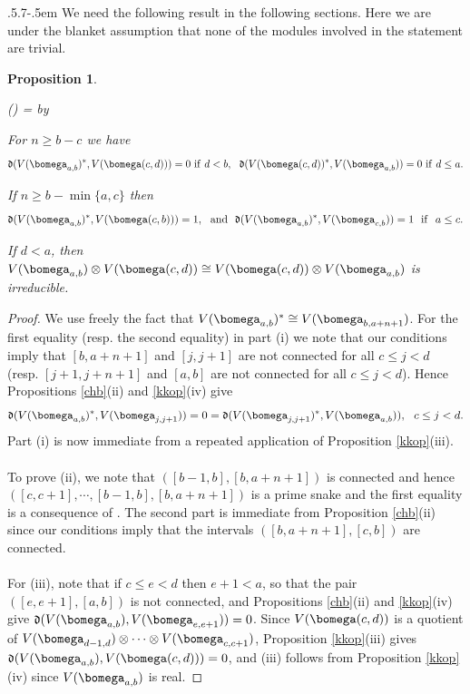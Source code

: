 \documentclass[11pt,reqno]{amsart}
\makeatletter
\newtheorem*{prop}{Proposition}
\theoremstyle{definition} \newtheorem*{defn}{Definition}
\theoremstyle{definition}
\newcounter{cnt}
\newenvironment{enumerit}{\begin{list}{{\hfill\rm(\roman{cnt})\hfill}}{%
\settowidth{\labelwidth}{{\rm(iv)}}\leftmargin=\labelwidth%
\advance\leftmargin by \labelsep\rightmargin=0pt\usecounter{cnt}}}{\end{list}} \makeatletter
\numberwithin{equation}{section}
\newcommand{\lie}[1]{\mathfrak{#1}}
\def\subsection{\def\@secnumfont{\bfseries}\@startsection{subsection}{2}%
  {\parindent}{.5\linespacing\@plus.7\linespacing}{-.5em}%
  {\normalfont\bfseries}}
\makeatother
\begin{document}
\subsection{} We need the following result in the following sections. Here we are under the blanket assumption that none of the modules involved in the statement are trivial. \begin{prop}\label{unmixedpair} \begin{enumerit}
    \item[(i)] For $n\ge b-c$  we have $$\lie d(V(\bomega_{a,b})^*, V(\bomega(c,d)))=0\ {\rm if}\  d<b,\ \  \lie d( V(\bomega(c,d))^*, V(\bomega_{a,b}))=0 \ {\rm if}\  d\le a.$$
    \item[(ii)] If  $n\geq b-\min\{a,c\}$ then
    $$\lie d (V(\bomega_{a,b})^*,V(\bomega(c,b)))=1,\ \ {\rm and}\ \ \lie d (V(\bomega_{a,b})^*,V(\bomega_{c,b}))=1\ \ {\rm if}\ \ a\le c.$$
    \item[(iii)] If $d<a$, then $V(\bomega_{a,b})\otimes V(\bomega(c,d))\cong V(\bomega(c,d))\otimes V(\bomega_{a,b})$
    is irreducible.
\end{enumerit}
\end{prop}
    \begin{proof}  We use freely the fact that $V(\bomega_{a,b})^* \cong V(\bomega_{b,a+n+1})$. For the first equality (resp. the second equality) in part (i)
 we note that our conditions imply that $[b,a+n+1]$ and $[j,j+1]$ are not connected for all $c\le j<d$ (resp. $[j+1,j+n+1]$ and $[a,b]$  are not connected for all $c\le j<d$). Hence Propositions \ref{chb}(ii) and \ref{kkop}(iv) give $$\lie d(V(\bomega_{a,b})^*, V(\bomega_{j,j+1}))=0=\lie d(V(\bomega_{j,j+1})^*, V(\bomega_{a,b})),\ \ c\le j<d.$$
Part (i)  is now  immediate from a repeated application of  Proposition \ref{kkop}(iii).\\\\
To prove (ii), we note that $([b-1,b],[b,a+n+1])$  is connected and hence $([c,c+1],\cdots, [b-1,b],[b,a+n+1])$ is a prime snake and the first equality is a consequence of  \cite[Lemma 6.2.1]{Naoi24}.
The second part is immediate from Proposition \ref{chb}(ii) since our conditions imply that
the intervals $([b,a+n+1],[c,b])$ are connected.\\\\
For (iii), note that if $c\le e<d$ then $e+1<a$, so that the pair $([e,e+1],[a,b])$ is not connected,
and Propositions \ref{chb}(ii) and \ref{kkop}(iv) give $\lie d(V(\bomega_{a,b}),V(\bomega_{e,e+1}))=0$.
Since $V(\bomega(c,d))$ is a quotient of $V(\bomega_{d-1,d})\otimes\cdots\otimes V(\bomega_{c,c+1})$,
Proposition \ref{kkop}(iii) gives $\lie d(V(\bomega_{a,b}),V(\bomega(c,d)))=0$, and (iii) follows from
Proposition \ref{kkop}(iv) since $V(\bomega_{a,b})$ is real.
  \end{proof}
\end{document}
